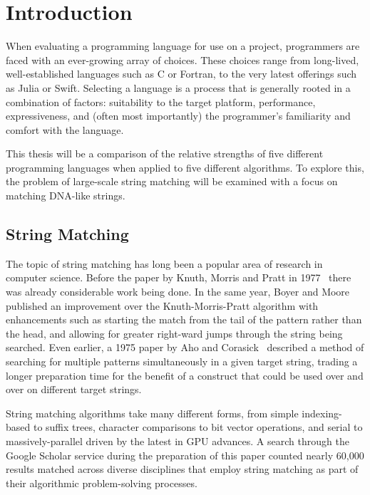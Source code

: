 \section{Introduction}
\label{sec:introduction}

When evaluating a programming language for use on a project, programmers are faced with an ever-growing array of choices. These choices range from long-lived, well-established languages such as C or Fortran, to the very latest offerings such as Julia or Swift. Selecting a language is a process that is generally rooted in a combination of factors: suitability to the target platform, performance, expressiveness, and (often most importantly) the programmer's familiarity and comfort with the language.

This thesis will be a comparison of the relative strengths of five different programming languages when applied to five different algorithms. To explore this, the problem of large-scale string matching will be examined with a focus on matching DNA-like strings.

\subsection{String Matching}

The topic of string matching has long been a popular area of research in computer science. Before the paper by Knuth, Morris and Pratt in 1977~\cite{knuth} there was already considerable work being done. In the same year, Boyer and Moore~\cite{boyer} published an improvement over the Knuth-Morris-Pratt algorithm with enhancements such as starting the match from the tail of the pattern rather than the head, and allowing for greater right-ward jumps through the string being searched. Even earlier, a 1975 paper by Aho and Corasick~\cite{aho} described a method of searching for multiple patterns simultaneously in a given target string, trading a longer preparation time for the benefit of a construct that could be used over and over on different target strings.

String matching algorithms take many different forms, from simple indexing-based to suffix trees, character comparisons to bit vector operations, and serial to massively-parallel driven by the latest in GPU advances. A search through the Google Scholar service during the preparation of this paper counted nearly 60,000 results matched across diverse disciplines that employ string matching as part of their algorithmic problem-solving processes.


